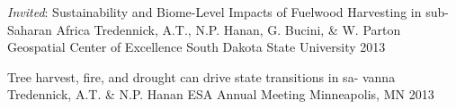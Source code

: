 \begin{pubentries}
\pubentry
    {\emph{Invited}: Sustainability and Biome-Level Impacts of Fuelwood Harvesting in sub-Saharan Africa} %
    {Tredennick, A.T., N.P. Hanan, G. Bucini, \& W. Parton} %
    {Geospatial Center of Excellence} %
    {South Dakota State University} %
    {2013} %

\pubentry
    {Tree harvest, fire, and drought can drive state transitions in sa- vanna} %
    {Tredennick, A.T. \& N.P. Hanan} %
    {ESA Annual Meeting} %
    {Minneapolis, MN} %
    {2013} %




\end{pubentries}

